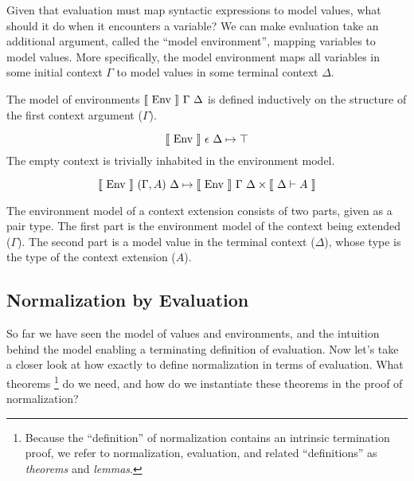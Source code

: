 \documentclass{llncs}
\newenvironment{mydefinition}[3]
{ \begin{mydefinition'}[#1] \label{def:#2}
  \hfill\break
  #3
}
{ \end{mydefinition'} }
\def\cross{\times}
\def\dfn{\mapsto}
\def\emp{\epsilon}
\newcommand{\el}[1]{\llbracket ~ #1 ~ \rrbracket}
\newcommand{\fun}[1]{\textmd{#1}}
\newcommand{\dtypm}[1]{\el{\Delta \vdash #1}}
\def\menv{\el{\fun{Env}}~\Gamma~\Delta}
\newcommand{\dmenv}[1]{\el{\fun{Env}}~#1~\Delta}
\begin{document}
Given that evaluation must map syntactic expressions to model values,
what should it do when it encounters a variable? We can make
evaluation take an additional argument, called the
``model environment'', mapping variables to model values. More
specifically, the model environment maps all variables in
some initial context $\Gamma$ to model values in some terminal context
$\Delta$.


\begin{mydefinition}{Model of Environments}{menv}
{
The model of environments $\menv$ is defined inductively on the structure
of the first context argument ($\Gamma$).
}

\begin{mycase}
$$
\dmenv{\emp} \dfn \top
$$
The empty context is trivially inhabited in the environment model.
\end{mycase}

\begin{mycase}
$$
\dmenv{(\Gamma, A)} \dfn \dmenv{\Gamma} \cross \dtypm{A}
$$

The environment model of a context extension consists of two parts,
given as a pair type. The first part
is the environment model of the context being extended ($\Gamma$). The second part
is a model value in the terminal context ($\Delta$),
whose type is the type of the context extension ($A$).

\end{mycase}

\end{mydefinition}

\subsection{Normalization by Evaluation}

So far we have seen the model of values and environments, and the
intuition behind the model enabling a terminating definition of evaluation.
Now let's take a closer look at how exactly to define normalization in
terms of evaluation. What theorems 
\footnote{Because the ``definition'' of normalization contains an
intrinsic termination proof, we refer to normalization, evaluation, and
related ``definitions'' as \textit{theorems} and \textit{lemmas}.}
do we need, and how do we instantiate these theorems in the proof of
normalization?
\end{document}
